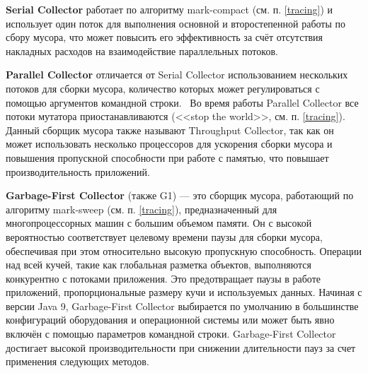 \textbf{Serial Collector} работает по алгоритму mark-compact (см. п. \ref{tracing}) и использует один поток для выполнения основной и второстепенной работы по сбору мусора, что может повысить его эффективность за счёт отсутствия накладных расходов на взаимодействие параллельных потоков.~\cite{java_21_available_collectors}

\textbf{Parallel Collector} отличается от Serial Collector использованием нескольких потоков для сборки мусора, количество которых может регулироваться с помощью аргументов командной строки.~\cite{java_21_available_collectors} Во время работы Parallel Collector все потоки мутатора приостанавливаются (<<stop the world>>, см. п. \ref{tracing}).~\cite{java_jrockit_memory} Данный сборщик мусора также называют Throughput Collector, так как он может использовать несколько процессоров для ускорения сборки мусора и повышения пропускной способности при работе с памятью, что повышает производительность приложений.~\cite{java_gc_basics}

\textbf{Garbage-First Collector} (также G1) --- это сборщик мусора, работающий по алгоритму mark-sweep (см. п. \ref{tracing}), предназначенный для многопроцессорных машин с большим объемом памяти. Он с высокой вероятностью соответствует целевому времени паузы для сборки мусора, обеспечивая при этом относительно высокую пропускную способность. Операции над всей кучей, такие как глобальная разметка объектов, выполняются конкурентно с потоками приложения. Это предотвращает паузы в работе приложений, пропорциональные размеру кучи и используемых данных. Начиная с версии Java 9, Garbage-First Collector выбирается по умолчанию в большинстве конфигураций оборудования и операционной системы или может быть явно включён с помощью параметров командной строки. Garbage-First Collector достигает высокой производительности при снижении длительности пауз за счет применения следующих методов.~\cite{java_g1}

